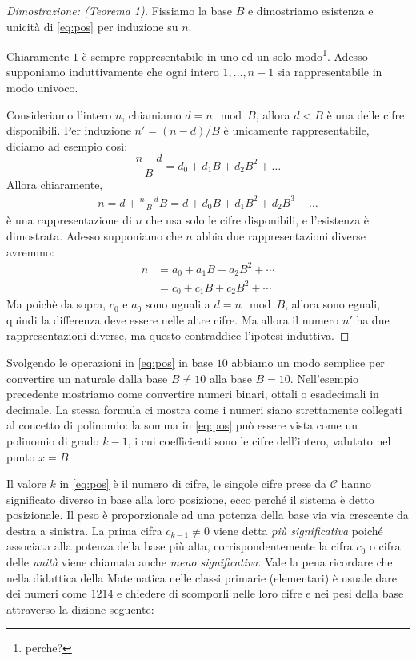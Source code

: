 \begin{proof}[Dimostrazione: (Teorema 1)]
Fissiamo la base $B$ e dimostriamo esistenza e unicità di \eqref{eq:pos} per induzione su $n$.

Chiaramente $1$ è sempre rappresentabile in uno ed un solo modo\footnote{perche?}. Adesso supponiamo induttivamente che ogni intero
$1,\ldots,n-1$ sia rappresentabile in modo univoco. 

\noindent Consideriamo l'intero $n$, chiamiamo $d = n \mod B$, allora $d < B$ è una delle cifre disponibili. Per induzione $n' = (n-d)/B$ è unicamente rappresentabile, diciamo ad esempio così:
\[ \frac{n-d}{B} = d_0 + d_1 B + d_2 B^2 + \ldots \]
Allora chiaramente,
\begin{align*}
n = d + \frac{n-d}{B}B = d + d_0 B + d_1 B^2 + d_2 B^3 + \ldots
\end{align*}
è una rappresentazione di $n$ che usa solo le cifre disponibili, e l'esistenza è dimostrata.
Adesso supponiamo che $n$ abbia due rappresentazioni diverse avremmo:
\begin{align*}
n &= a_0 + a_1B + a_2B^2 + \cdots\\
  &= c_0 + c_1B + c_2B^2 + \cdots
\end{align*}
Ma poichè da sopra, $c_0$ e $a_0$ sono uguali a $d = n \mod B$, allora sono eguali, quindi la differenza deve essere nelle altre cifre. Ma allora il numero $n'$ ha due rappresentazioni diverse, ma questo 
contraddice l'ipotesi induttiva.
\end{proof}


Svolgendo le operazioni in \eqref{eq:pos} in base $10$ abbiamo un modo
semplice per convertire un naturale dalla base $B \neq 10$ alla base $B = 10$.
Nell'esempio precedente mostriamo come convertire numeri binari, ottali o
esadecimali in decimale. La stessa formula ci mostra come i numeri siano
strettamente collegati al concetto di polinomio: la somma in \eqref{eq:pos} può essere
vista come un polinomio di grado $k-1$, i cui coefficienti sono le cifre
dell'intero, valutato nel punto $x = B$.

Il valore $k$ in \eqref{eq:pos} è il numero di cifre, le singole cifre prese da
$\mathcal{C}$ hanno significato diverso in base alla loro posizione, ecco
perché il sistema è detto posizionale. Il peso è proporzionale ad una potenza
della base via via crescente da destra a sinistra. La prima cifra $c_{k-1} \neq
0$ viene detta \emph{più significativa} poiché associata alla potenza della
base più alta, corrispondentemente la cifra $c_0$ o cifra delle \emph{unità}
viene chiamata anche \emph{meno significativa}. Vale la pena ricordare che nella didattica della Matematica nelle classi primarie (elementari) 
è usuale dare dei numeri come $1214$ e chiedere di scomporli nelle
loro cifre e nei pesi della base attraverso la dizione seguente:

